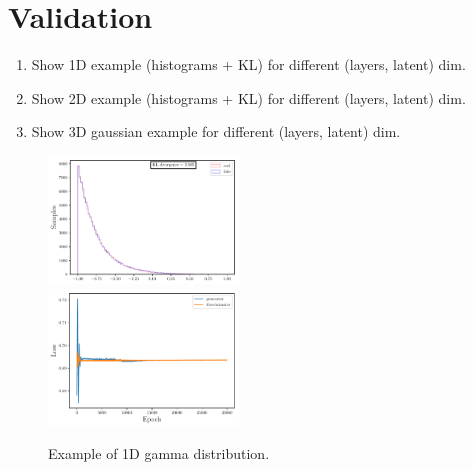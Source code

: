 \documentclass[twocolumn,preprintnumbers,superscriptaddress]{revtex4-2}
\begin{document}
\section{Validation}
\label{sec:validation}

\begin{enumerate}
  \item Show 1D example (histograms + KL) for different (layers, latent) dim.
  \item Show 2D example (histograms + KL) for different (layers, latent) dim.
  \item Show 3D gaussian example for different (layers, latent) dim.
\end{enumerate}

\begin{figure}
  \includegraphics[width=0.45\textwidth]{plots/1Dgamma/1-distribution_100000_100_1_3_2_10000_128_0.5.pdf}\\
  \includegraphics[width=0.45\textwidth]{plots/1Dgamma/loss_100000_100_1_3_2_10000_128_0.5.pdf}
  \caption{Example of 1D gamma distribution.}
\end{figure}
\end{document}
